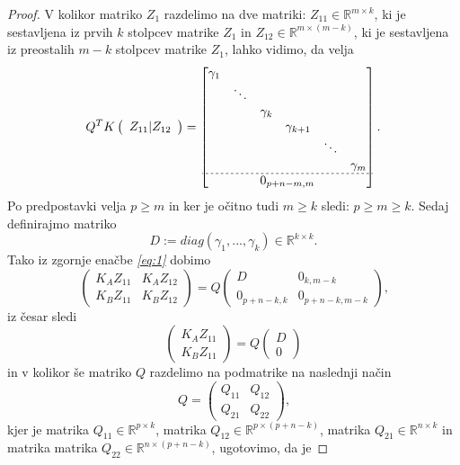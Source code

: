 \documentclass[mat1]{article}
\begin{document}
\begin{proof}
V kolikor matriko $Z_1$ razdelimo na dve matriki: $Z_{11} \in \mathbb{R}^{m \times k}$, ki je sestavljena iz prvih $k$ stolpcev matrike $Z_1$ in $Z_{12} \in \mathbb{R}^{m \times (m-k)}$, ki je sestavljena iz preostalih $m-k$ stolpcev matrike $Z_1$, lahko vidimo, da velja
$$ Q^T K \left(\begin{array}{c} Z_{11} | Z_{12} \end{array}\right) = 
\begin{bmatrix}
\begin{matrix}
\gamma_1 & & & & & \\
 & \ddots & & & & \\
 & & \gamma_k & & & \\
 & & & \gamma_{k+1} & & \\
 & & & & \ddots & \\
 & & & & & \gamma_m 
\end{matrix} \\ \hdashline[2pt/2pt]
0_{p+n-m, m}
\end{bmatrix}
\text{.}
$$
Po predpostavki velja $p \geq m$ in ker je očitno tudi $m \geq k$ sledi: $p \geq m \geq k$. Sedaj definirajmo matriko 
$$ D := diag(\gamma_1,..., \gamma_k) \in \mathbb{R}^{k \times k} \text{.}
$$
Tako iz zgornje enačbe \textit{\eqref{eq:1}} dobimo
\begin{equation}
\begin{pmatrix}
K_A Z_{11} & K_A Z_{12} \\ 
K_B Z_{11} & K_B Z_{12}
\end{pmatrix} = Q
\begin{pmatrix}
D & 0_{k, m-k} \\ 
0_{p+n-k, k} & 0_{p+n-k, m-k} 
\end{pmatrix} \text{,} \label{eq:2}
\end{equation}
iz česar sledi
$$
\begin{pmatrix}
K_A Z_{11} \\ 
K_B Z_{11}
\end{pmatrix} = Q
\begin{pmatrix}
D \\ 
0
\end{pmatrix}
$$ in v kolikor še matriko $Q$ razdelimo na podmatrike na naslednji način
$$ Q = 
\begin{pmatrix}
Q_{11} & Q_{12} \\ 
Q_{21} & Q_{22}
\end{pmatrix} \text{,}
$$ kjer je matrika $Q_{11} \in \mathbb{R}^{p \times k}$, matrika $Q_{12} \in \mathbb{R}^{p \times (p+n-k)}$, matrika $Q_{21} \in \mathbb{R}^{ n \times k}$ in matrika matrika $Q_{22} \in \mathbb{R}^{ n \times (p+n-k)}$, ugotovimo, da je

\end{proof}
\end{document}
